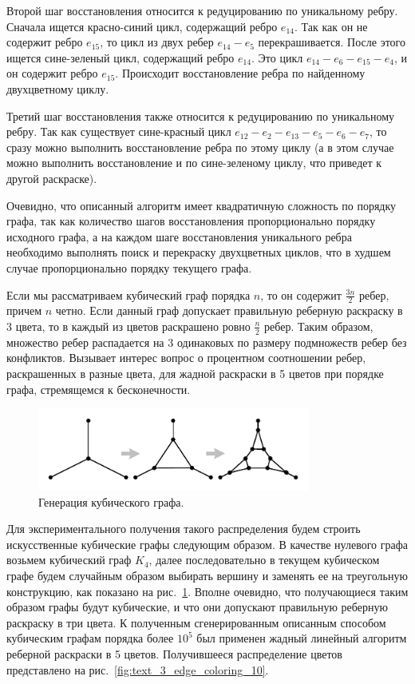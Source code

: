 Второй шаг восстановления относится к редуцированию по уникальному ребру.
Сначала ищется красно-синий цикл, содержащий ребро $e_{14}$.
Так как он не содержит ребро $e_{15}$, то цикл из двух ребер $e_{14}-e_5$ перекрашивается.
После этого ищется сине-зеленый цикл, содержащий ребро $e_{14}$.
Это цикл $e_{14}-e_6-e_{15}-e_4$, и он содержит ребро $e_{15}$.
Происходит восстановление ребра по найденному двухцветному циклу.

Третий шаг восстановления также относится к редуцированию по уникальному ребру.
Так как существует сине-красный цикл $e_{12}-e_2-e_{13}-e_5-e_6-e_7$, то сразу можно выполнить восстановление ребра по этому циклу (а в этом случае можно выполнить восстановление и по сине-зеленому циклу, что приведет к другой раскраске).

Очевидно, что описанный алгоритм имеет квадратичную сложность по порядку графа, так как количество шагов восстановления пропорционально порядку исходного графа, а на каждом шаге восстановления уникального ребра необходимо выполнять поиск и перекраску двухцветных циклов, что в худшем случае пропорционально порядку текущего графа.

Если мы рассматриваем кубический граф порядка $n$, то он содержит $\frac{3n}{2}$ ребер, причем $n$ четно.
Если данный граф допускает правильную реберную раскраску в 3 цвета, то в каждый из цветов раскрашено ровно $\frac{n}{2}$ ребер.
Таким образом, множество ребер распадается на 3 одинаковых по размеру подмножеств ребер без конфликтов.
Вызывает интерес вопрос о процентном соотношении ребер, раскрашенных в разные цвета, для жадной раскраски в 5 цветов при порядке графа, стремящемся к бесконечности.

\begin{figure}[ht]
\centering
\includegraphics[width=0.8\textwidth]{fig/par_edge_col_9-bubble.pdf}
\singlespacing
{}\caption{Генерация кубического графа.}
\label{fig:text_3_edge_coloring_9}
\end{figure}

Для экспериментального получения такого распределения будем строить искусственные кубические графы следующим образом.
В качестве нулевого графа возьмем кубический граф $K_4$, далее последовательно в текущем кубическом графе будем случайным образом выбирать вершину и заменять ее на треугольную конструкцию, как показано на рис.~\ref{fig:text_3_edge_coloring_9}.
Вполне очевидно, что получающиеся таким образом графы будут кубические, и что они допускают правильную реберную раскраску в три цвета.
К полученным сгенерированным описанным способом кубическим графам порядка более $10^5$ был применен жадный линейный алгоритм реберной раскраски в 5 цветов.
Получившееся распределение цветов представлено на рис.~\ref{fig:text_3_edge_coloring_10}.

